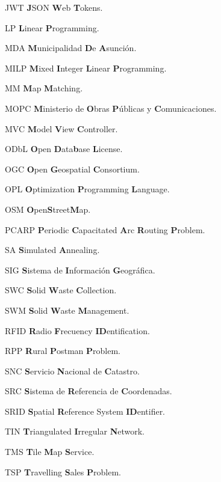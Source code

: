 \begin{abbreviations}
    \item[JWT] \textbf{J}SON \textbf{W}eb \textbf{T}okens.
    \item[LP] \textbf{L}inear \textbf{P}rogramming.
    \item[MDA] \textbf{M}unicipalidad \textbf{D}e \textbf{A}sunción.
    \item[MILP] \textbf{M}ixed \textbf{I}nteger \textbf{L}inear \textbf{P}rogramming.
    \item[MM] \textbf{M}ap \textbf{M}atching.
    \item[MOPC] \textbf{M}inisterio de \textbf{O}bras \textbf{P}úblicas y \textbf{C}omunicaciones.
    \item[MVC] \textbf{M}odel \textbf{V}iew \textbf{C}ontroller.
    \item[ODbL] \textbf{O}pen \textbf{D}ata\textbf{b}ase \textbf{L}icense.
    \item[OGC] \textbf{O}pen \textbf{G}eospatial \textbf{C}onsortium.
    \item[OPL] \textbf{O}ptimization \textbf{P}rogramming \textbf{L}anguage.
    \item[OSM] \textbf{O}pen\textbf{S}treet\textbf{M}ap.
    \item[PCARP] \textbf{P}eriodic \textbf{C}apacitated \textbf{A}rc \textbf{R}outing \textbf{P}roblem.
    \item[SA] \textbf{S}imulated \textbf{A}nnealing.
    \item[SIG] \textbf{S}istema de \textbf{I}nformación \textbf{G}eográfica.
    \item[SWC] \textbf{S}olid \textbf{W}aste \textbf{C}ollection.    
    \item[SWM] \textbf{S}olid \textbf{W}aste \textbf{M}anagement.
    \item[RFID] \textbf{R}adio \textbf{F}recuency \textbf{ID}entification.
    \item[RPP] \textbf{R}ural \textbf{P}ostman \textbf{P}roblem.
    \item[SNC] \textbf{S}ervicio \textbf{N}acional de \textbf{C}atastro.
    \item[SRC] \textbf{S}istema de \textbf{R}eferencia de \textbf{C}oordenadas.
    \item[SRID] \textbf{S}patial \textbf{R}eference System \textbf{ID}entifier.
    \item[TIN] \textbf{T}riangulated \textbf{I}rregular \textbf{N}etwork.
    \item[TMS] \textbf{T}ile \textbf{M}ap \textbf{S}ervice.
    \item[TSP] \textbf{T}ravelling \textbf{S}ales \textbf{P}roblem.

\end{abbreviations}
